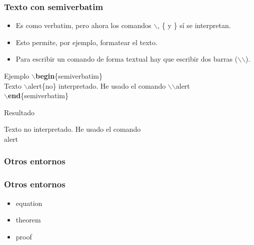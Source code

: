 \documentclass[aspectratio=43]{beamer}%
\newcommand\rojo[1]{\textcolor[RGB]{237,41,57}{#1}}
\begin{document}
\begin{frame}[fragile]
\frametitle{\textbf{Texto con semiverbatim}}
\justifying
 
 \begin{itemize}\justifying
  \item Es como verbatim, pero ahora los comandos \rojo{$\backslash$}, \rojo{\{} y \rojo{\}} sí se interpretan.
  \item Esto permite, por ejemplo, formatear el texto.
  \item Para escribir un comando de forma textual hay que escribir dos barras (\rojo{$\backslash$$\backslash$}).
\end{itemize}
\begin{exampleblock}{Ejemplo}
$\backslash$\textbf{begin}\{semiverbatim\}\\
  Texto $\backslash$\rojo{alert}\{no\} interpretado. He usado el comando $\backslash$$\backslash$alert\\
$\backslash$\textbf{end}\{semiverbatim\}
\end{exampleblock}

\begin{block}{Resultado}
\begin{semiverbatim}
  Texto \alert{no} interpretado. He usado el comando \\alert
\end{semiverbatim}
\end{block}
\end{frame}
\subsubsection{Otros entornos}
\begin{frame}[fragile]
\frametitle{\textbf{Otros entornos}}
\justifying
 \begin{itemize}\justifying
  \item equation
  \item theorem
  \item proof
\end{itemize}

\end{frame}
\end{document}
